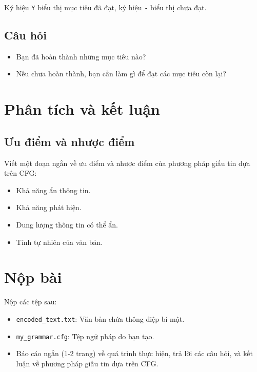 \documentclass{article}
\begin{document}
Ký hiệu \texttt{Y} biểu thị mục tiêu đã đạt, ký hiệu \texttt{-} biểu thị chưa đạt.

\subsection{Câu hỏi}
\begin{itemize}
    \item Bạn đã hoàn thành những mục tiêu nào?
    \item Nếu chưa hoàn thành, bạn cần làm gì để đạt các mục tiêu còn lại?
\end{itemize}

\section{Phân tích và kết luận}
\subsection{Ưu điểm và nhược điểm}
Viết một đoạn ngắn về ưu điểm và nhược điểm của phương pháp giấu tin dựa trên CFG:

\begin{itemize}
    \item Khả năng ẩn thông tin.
    \item Khả năng phát hiện.
    \item Dung lượng thông tin có thể ẩn.
    \item Tính tự nhiên của văn bản.
\end{itemize}

\section{Nộp bài}
Nộp các tệp sau:
\begin{itemize}
    \item \texttt{encoded_text.txt}: Văn bản chứa thông điệp bí mật.
    \item \texttt{my_grammar.cfg}: Tệp ngữ pháp do bạn tạo.
    \item Báo cáo ngắn (1-2 trang) về quá trình thực hiện, trả lời các câu hỏi, và kết luận về phương pháp giấu tin dựa trên CFG.
\end{itemize}
\end{document}
